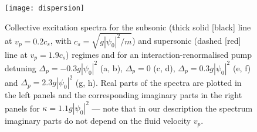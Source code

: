 \begin{figure}[tb]\centering
\texttt{[image: dispersion]} %
\caption{
%
Collective excitation spectra for the subsonic (thick
solid [black] line at $v_p=0.2 c_s$, with $c_s=\sqrt{g|\psi_0|^2/m}$)
and supersonic (dashed [red] line at $v_p=1.9 c_s$) regimes and for an
interaction-renormalised pump detuning $\Delta_p=-0.3 g|\psi_0|^2$ (a,
b), $\Delta_p = 0$ (c, d), $\Delta_p=0.3g|\psi_0|^2$ (e, f) and
$\Delta_p=2.3g|\psi_0|^2$ (g, h). Real parts of the spectra are
plotted in the left panels and the corresponding imaginary parts in
the right panels for $\kappa=1.1 g|\psi_0|^2$ --- note that in our
description the spectrum imaginary parts do not depend on the fluid
velocity $v_p$.
%
}\label{fig:spect_pmp_only}
\end{figure}
%


